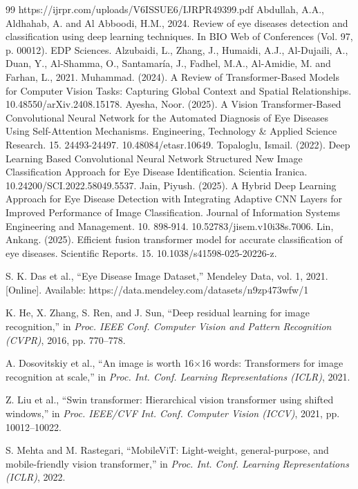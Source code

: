 \documentclass[conference,9pt]{IEEEtran}
\begin{document}
\begin{thebibliography}{99}
https://ijrpr.com/uploads/V6ISSUE6/IJRPR49399.pdf
Abdullah, A.A., Aldhahab, A. and Al Abboodi, H.M., 2024. Review of eye diseases detection and classification using deep learning techniques. In BIO Web of Conferences (Vol. 97, p. 00012). EDP Sciences. 
Alzubaidi, L., Zhang, J., Humaidi, A.J., Al-Dujaili, A., Duan, Y., Al-Shamma, O., Santamaría, J., Fadhel, M.A., Al-Amidie, M. and Farhan, L., 2021.
Muhammad. (2024). A Review of Transformer-Based Models for Computer Vision Tasks: Capturing Global Context and Spatial Relationships. 10.48550/arXiv.2408.15178.
Ayesha, Noor. (2025). A Vision Transformer-Based Convolutional Neural Network for the Automated Diagnosis of Eye Diseases Using Self-Attention Mechanisms. Engineering, Technology \& Applied Science Research. 15. 24493-24497. 10.48084/etasr.10649.
Topaloglu, Ismail. (2022). Deep Learning Based Convolutional Neural Network Structured New Image Classification Approach for Eye Disease Identification. Scientia Iranica. 10.24200/SCI.2022.58049.5537.
Jain, Piyush. (2025). A Hybrid Deep Learning Approach for Eye Disease Detection with Integrating Adaptive CNN Layers for Improved Performance of Image Classification. Journal of Information Systems Engineering and Management. 10. 898-914. 10.52783/jisem.v10i38s.7006.
Lin, Ankang. (2025). Efficient fusion transformer model for accurate classification of eye diseases. Scientific Reports. 15. 10.1038/s41598-025-20226-z.

S. K. Das et al., “Eye Disease Image Dataset,” Mendeley Data, vol. 1, 2021. [Online]. Available: https://data.mendeley.com/datasets/n9zp473wfw/1

K. He, X. Zhang, S. Ren, and J. Sun, “Deep residual learning for image recognition,” in \emph{Proc. IEEE Conf. Computer Vision and Pattern Recognition (CVPR)}, 2016, pp. 770–778.

A. Dosovitskiy et al., “An image is worth 16×16 words: Transformers for image recognition at scale,” in \emph{Proc. Int. Conf. Learning Representations (ICLR)}, 2021.

Z. Liu et al., “Swin transformer: Hierarchical vision transformer using shifted windows,” in \emph{Proc. IEEE/CVF Int. Conf. Computer Vision (ICCV)}, 2021, pp. 10012–10022.

S. Mehta and M. Rastegari, “MobileViT: Light-weight, general-purpose, and mobile-friendly vision transformer,” in \emph{Proc. Int. Conf. Learning Representations (ICLR)}, 2022.


\end{thebibliography}
\end{document}
